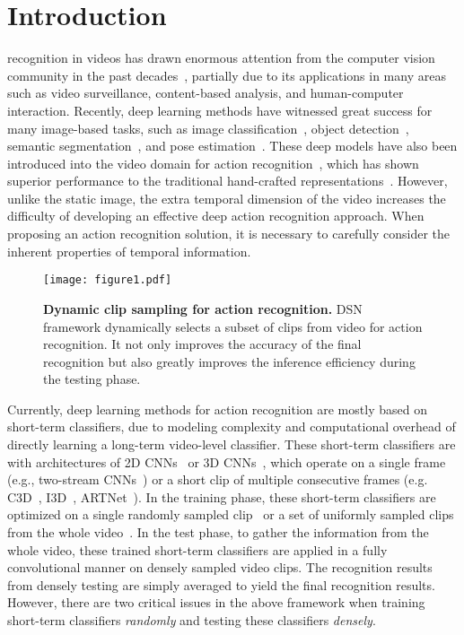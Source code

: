\documentclass[journal]{IEEEtran}
\begin{document}
\IEEEpeerreviewmaketitle


\section{Introduction}
\label{intr}

 recognition in videos has drawn enormous attention from the computer vision community in the past decades~\cite{WangS13a,SimonyanZ14,KarpathyTSLSF14,TranBFTP15,TSN-J,CarreiraZ17,R2+1D,ArtNet,s3d,nonlocal}, partially due to its applications in many areas such as video surveillance, content-based analysis, and human-computer interaction.
Recently, deep learning methods have witnessed great success for many image-based tasks, such as image classification~\cite{HeZRS16,KrizhevskySH12}, object detection~\cite{GirshickDDM14}, semantic segmentation~\cite{LongSD15}, and pose estimation~\cite{HeGDG17}.
These deep models have also been introduced into the video domain for action recognition~\cite{TSN-J, CarreiraZ17}, which has shown superior performance to the traditional hand-crafted representations~\cite{WangS13a}.
However, unlike the static image, the extra temporal dimension of the video increases the difficulty of developing an effective deep action recognition approach.
When proposing an action recognition solution,  it is necessary to carefully consider the inherent properties of temporal information.


\begin{figure}
\centering
\texttt{[image: figure1.pdf]}
\caption{\textbf{Dynamic clip sampling for action recognition.} DSN framework dynamically selects a subset of clips from video for action recognition.
It not only improves the accuracy of the final recognition but also greatly improves the inference efficiency during the testing phase.}
\label{fig:intr}
\end{figure}

Currently, deep learning methods for action recognition are mostly based on short-term classifiers, due to modeling complexity and computational overhead of directly learning a long-term video-level classifier. These short-term classifiers are with architectures of 2D CNNs~\cite{lecun-98} or 3D CNNs~\cite{JiXYY13}, which operate on a single frame (e.g., two-stream CNNs~\cite{SimonyanZ14}) or a short clip of multiple consecutive frames (e.g. C3D~\cite{TranBFTP15}, I3D~\cite{CarreiraZ17}, ARTNet~\cite{ArtNet}).
In the training phase, these short-term classifiers are optimized on a single randomly sampled clip~\cite{TranBFTP15,SimonyanZ14} or a set of uniformly sampled clips from the whole video~\cite{TSN-J}.
In the test phase, to gather the information from the whole video, these trained short-term classifiers are applied in a fully convolutional manner on densely sampled video clips. The recognition results from densely testing are simply averaged to yield the final recognition results.
However, there are two critical issues in the above framework when training short-term classifiers  {\em randomly} and testing these classifiers  {\em densely}.
\end{document}
